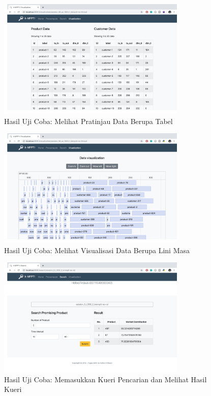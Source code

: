 \begin{figure}[H]
	\centering
	\includegraphics[width=9cm]{assets/img/bab5/hasil4.png}
	\caption{Hasil Uji Coba: Melihat Pratinjau Data Berupa Tabel}
	\label{fig:hasil-performa4}
\end{figure}

\begin{figure}[H]
	\centering
	\includegraphics[width=9cm]{assets/img/bab5/hasil5.png}
	\caption{Hasil Uji Coba: Melihat Visualisasi Data Berupa Lini Masa}
	\label{fig:hasil-performa5}
\end{figure}

\begin{figure}[H]
	\centering
	\includegraphics[width=9cm]{assets/img/bab5/hasil6.png}
	\caption{Hasil Uji Coba: Memasukkan Kueri Pencarian dan Melihat Hasil Kueri}
	\label{fig:hasil-performa6}
\end{figure}

